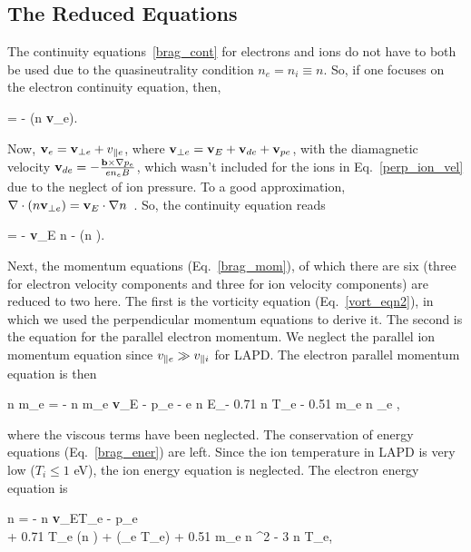 \subsection{The Reduced Equations}
\label{ss_reduced_eqns}

The continuity equations~\ref{brag_cont} for electrons and ions do not have to both be used due to the quasineutrality condition $n_e = n_i \equiv n$. So, if one focuses on the electron
continuity equation, then,

\beq
\label{cont1}
 = - \grad \cdot (n {\bf v}_e).
\eeq

Now, ${\bf v}_e = {\bf v}_{\perp e} + v_{\parallel e}$, where ${\bf v}_{\perp e} = {\bf v}_{E} + {\bf v}_{d e} + {\bf v}_{p e}$, with the diamagnetic velocity 
${\bf v}_{d e} = - \frac{{\bf b} \times \nabla p_e}{e n_e B}$, which wasn't included for the ions in Eq.~\ref{perp_ion_vel} due to the neglect of ion pressure. 
To a good approximation, $\nabla \cdot (n {\bf v}_{\perp e}) = {\bf v}_{E} \cdot \nabla n$~\cite{Popovich2010a,simakov2003}. So, the continuity equation reads

\beq
\label{cont_eqn}
 = - {\bf v}_{E} \cdot \grad n - \gradpar (n \vpe).
\eeq

Next, the momentum equations (Eq.~\ref{brag_mom}), of which there are six (three for electron velocity components and three for ion velocity components) are reduced to two here. The first is the
vorticity equation (Eq.~\ref{vort_eqn2}), in which we used the perpendicular momentum equations to derive it. The second is the equation for the parallel electron momentum. We neglect the parallel
ion momentum equation since $v_{\parallel e} \gg v_{\parallel i}$ for LAPD. The electron parallel momentum equation is then

\beq
\label{mom_eqn}
n m_e  = - n m_e {\bf v}_E \cdot \grad \vpe - \gradpar p_e - e n E_\para - 0.71 n \gradpar T_e - 0.51 m_e n \nu_e \vpe,
\eeq

where the viscous terms have been neglected. The conservation of energy equations (Eq.~\ref{brag_ener}) are left. Since the ion temperature in LAPD is very low ($T_i \leq 1$ eV), the ion energy
equation is neglected. The electron energy equation is~\cite{simakov2003}

\beqar
\label{elec_ener}
 n  = -  n {\bf v}_E\cdot \grad T_e - p_e \gradpar \vpe \\ \nonumber
+ 0.71 T_e \grad \cdot (n \vpe) + \gradpar (\kappa_{\para e} \gradpar T_e) + 0.51 m_e n \nue \vpe^2 - 3  n \nue T_e,
\eeqar

